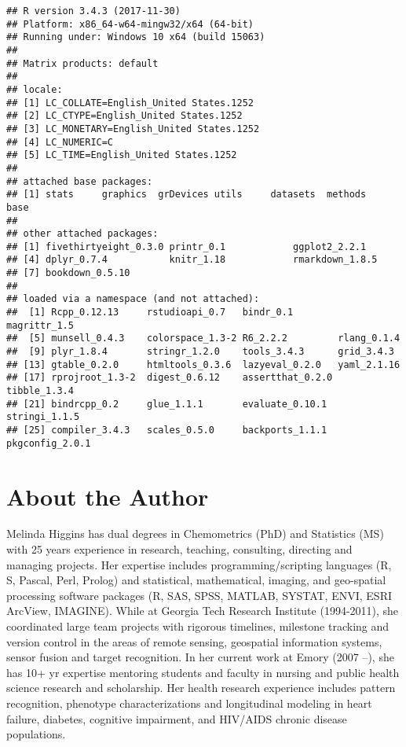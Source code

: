 \documentclass[]{book}
\theoremstyle{definition}
\theoremstyle{definition}
\theoremstyle{definition}
\theoremstyle{remark}
\begin{document}
\begin{verbatim}
## R version 3.4.3 (2017-11-30)
## Platform: x86_64-w64-mingw32/x64 (64-bit)
## Running under: Windows 10 x64 (build 15063)
## 
## Matrix products: default
## 
## locale:
## [1] LC_COLLATE=English_United States.1252 
## [2] LC_CTYPE=English_United States.1252   
## [3] LC_MONETARY=English_United States.1252
## [4] LC_NUMERIC=C                          
## [5] LC_TIME=English_United States.1252    
## 
## attached base packages:
## [1] stats     graphics  grDevices utils     datasets  methods   base     
## 
## other attached packages:
## [1] fivethirtyeight_0.3.0 printr_0.1            ggplot2_2.2.1        
## [4] dplyr_0.7.4           knitr_1.18            rmarkdown_1.8.5      
## [7] bookdown_0.5.10      
## 
## loaded via a namespace (and not attached):
##  [1] Rcpp_0.12.13     rstudioapi_0.7   bindr_0.1        magrittr_1.5    
##  [5] munsell_0.4.3    colorspace_1.3-2 R6_2.2.2         rlang_0.1.4     
##  [9] plyr_1.8.4       stringr_1.2.0    tools_3.4.3      grid_3.4.3      
## [13] gtable_0.2.0     htmltools_0.3.6  lazyeval_0.2.0   yaml_2.1.16     
## [17] rprojroot_1.3-2  digest_0.6.12    assertthat_0.2.0 tibble_1.3.4    
## [21] bindrcpp_0.2     glue_1.1.1       evaluate_0.10.1  stringi_1.1.5   
## [25] compiler_3.4.3   scales_0.5.0     backports_1.1.1  pkgconfig_2.0.1
\end{verbatim}

\chapter*{About the Author}\label{about-the-author}

Melinda Higgins has dual degrees in Chemometrics (PhD) and Statistics
(MS) with 25 years experience in research, teaching, consulting,
directing and managing projects. Her expertise includes
programming/scripting languages (R, S, Pascal, Perl, Prolog) and
statistical, mathematical, imaging, and geo-spatial processing software
packages (R, SAS, SPSS, MATLAB, SYSTAT, ENVI, ESRI ArcView, IMAGINE).
While at Georgia Tech Research Institute (1994-2011), she coordinated
large team projects with rigorous timelines, milestone tracking and
version control in the areas of remote sensing, geospatial information
systems, sensor fusion and target recognition. In her current work at
Emory (2007 --), she has 10+ yr expertise mentoring students and faculty
in nursing and public health science research and scholarship. Her
health research experience includes pattern recognition, phenotype
characterizations and longitudinal modeling in heart failure, diabetes,
cognitive impairment, and HIV/AIDS chronic disease populations.
\end{document}

